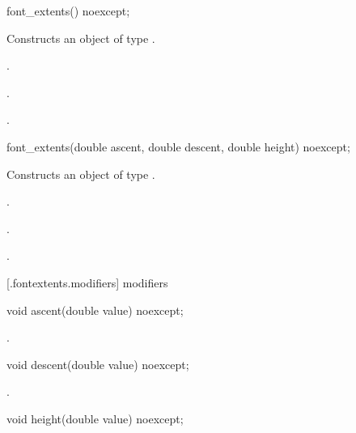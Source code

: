 \begin{itemdecl}
    font_extents() noexcept;
\end{itemdecl}
\begin{itemdescr}
	\pnum
	\effects
	Constructs an object of type .
	
	\pnum
	\postconditions
	.
	
	.
	
	.
\end{itemdescr}

\begin{itemdecl}
    font_extents(double ascent, double descent, double height) noexcept;
\end{itemdecl}
\begin{itemdescr}
	\pnum
	\effects
	Constructs an object of type .
	
	\pnum
	\postconditions
	.
	
	.
	
	.
\end{itemdescr}

 [\iotwod.fontextents.modifiers]{ modifiers}

\begin{itemdecl}
    void ascent(double value) noexcept;
\end{itemdecl}

\begin{itemdescr}
	\pnum
	\postconditions
	.
\end{itemdescr}

\begin{itemdecl}
    void descent(double value) noexcept;
\end{itemdecl}

\begin{itemdescr}
	\pnum
	\postconditions
	.
	
\end{itemdescr}

\begin{itemdecl}
    void height(double value) noexcept;
\end{itemdecl}

